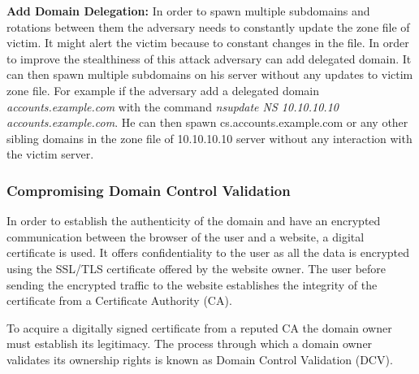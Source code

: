 \textbf{Add Domain Delegation:}
In order to spawn multiple subdomains and rotations between them the adversary needs to constantly update the zone file of victim. It might alert the victim because to constant changes in the file. In order to improve the stealthiness of this attack adversary can add delegated domain. It can then spawn multiple subdomains on his server without any updates to victim zone file. For example if the adversary add a delegated domain
\textit{accounts.example.com} with the command %
\textit{nsupdate NS 10.10.10.10 accounts.example.com}. He can then spawn cs.accounts.example.com or any other sibling domains in the zone file of 10.10.10.10 server without any interaction with the victim server. 




\subsubsection{Compromising Domain Control Validation\label{sec:domainvalidation}}


In order to establish the authenticity of the domain and have an encrypted communication between the browser of the user and a website, a digital certificate is used. It offers confidentiality to the user as all the data is encrypted using the SSL/TLS certificate offered by the website owner. The user before sending the encrypted traffic to the website establishes the integrity of the certificate from a  Certificate Authority (CA). 

To acquire a digitally signed certificate from a reputed CA  the domain owner must establish its legitimacy. The process through which a  domain owner validates its ownership rights is known as Domain Control Validation (DCV). 

